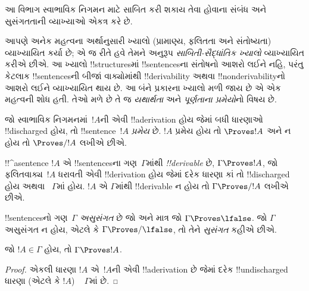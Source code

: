 \documentclass[../../../include/open-logic-section]{subfiles}
\begin{document}
      {}
      {}


\begin{editorial}
આ વિભાગ સ્વાભાવિક નિગમન માટે સાબિત કરી શકાય તેવા હોવાના સંબંધ અને
સુસંગતતાની વ્યાખ્યાઓ એકત્ર કરે છે.
\end{editorial}

\begin{explain}
આપણે અનેક મહત્વના અર્થાનુસારી ખ્યાલો (પ્રામાણ્ય, ફલિતતા અને સંતોષ્યતા)
વ્યાખ્યાયિત કર્યા છે; એ જ રીતે હવે તેમને અનુરૂપ \emph{સાબિતી-સૈદ્ધાંતિક
ખ્યાલો} વ્યાખ્યાયિત કરીએ છીએ. આ ખ્યાલો !!{structure}sમાં !!{sentence}sના
સંતોષનો આશરો લઈને નહિ, પરંતુ કેટલાક !!{sentence}sની બીજાં વાક્યોમાંથી
!!{derivability} અથવા !!{nonderivability}નો આશરો લઈને વ્યાખ્યાયિત થાય છે.
આ બંને પ્રકારના ખ્યાલો મળી જાય છે એ એક મહત્વની શોધ હતી. તેઓ મળે છે તે
જ \emph{યથાર્થતા} અને \emph{પૂર્ણતાના પ્રમેયો}નો વિષય છે.
\end{explain}


\begin{defn}[પ્રમેયો]
જો સ્વાભાવિક નિગમનમાં~$!A$ની એવી !!a{derivation} હોય જેમાં બધી ધારણાઓ
!!{discharged} હોય, તો !!{sentence}~$!A$ \emph{પ્રમેય} છે. $!A$
પ્રમેય હોય તો $\Proves !A$ અને ન હોય તો $\Proves/ !A$ લખીએ છીએ.
\end{defn}

\begin{defn}[!!^{derivability}]
!!^a{sentence} $!A$ એ !!{sentence}sના ગણ~$\Gamma$માંથી
\emph{!!{derivable}} છે, $\Gamma \Proves !A$, જો ફલિતવાક્ય~$!A$ ધરાવતી
એવી !!{derivation} હોય જેમાં દરેક ધારણા કાં તો !!{discharged} હોય અથવા
~$\Gamma$માં હોય. $!A$ એ $\Gamma$માંથી !!{derivable} ન હોય તો
$\Gamma \Proves/ !A$ લખીએ છીએ.
\end{defn}

\begin{defn}[સુસંગતતા]
!!{sentence}sનો ગણ~$\Gamma$ \emph{અસુસંગત} છે જો અને માત્ર જો
$\Gamma \Proves \lfalse$. જો $\Gamma$ અસુસંગત ન હોય, એટલે કે
$\Gamma \Proves/ \lfalse$, તો તેને \emph{સુસંગત} કહીએ છીએ.
\end{defn}

\begin{prop}[સ્વવાચકતા]
જો $!A \in \Gamma$ હોય, તો $\Gamma \Proves !A$.
\end{prop}

\begin{proof}
એકલી ધારણા $!A$ એ~$!A$ની એવી !!a{derivation} છે જેમાં દરેક
!!{undischarged} ધારણા (એટલે કે $!A$) ~ $\Gamma$માં છે.
\end{proof}
\end{document}
